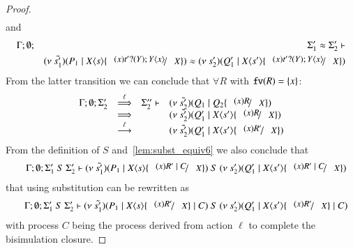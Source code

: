 \begin{proof}
\[\begin{array}{rcll}
	\end{array}
\]
%
	\noi and
%
	\begin{eqnarray}
		\Gamma; \es; &&\Sigma_1' \wb \Sigma_2' \proves \\
		&&\newsp{\tilde{s_1'}}{P_1 \Par \appl{X}{s} \subst{(x) \binp{t'}{Y} \appl{Y}{x}}{X}} \wb \newsp{s_2'}{Q_1' \Par \appl{X}{s'} \subst{(x) \binp{t'}{Y} \appl{Y}{x}}{X}}
		\label{lem:subst_equiv6}
	\end{eqnarray} 
%
	\noi From the latter transition we can conclude that $\forall R$ with $\mathtt{fv}(R) = \{x\}$:
%
\[
	\begin{array}{rcll}
		\Gamma; \es; \Sigma_2' &\By{\ell}& \Sigma_2'' \proves &
		\newsp{\tilde{s_2'}}{Q_1 \Par Q_2 \subst{(x) R}{X}}\\
		&\By{}& &
		\newsp{\tilde{s_2'}}{Q_1' \Par \appl{X}{s'} \subst{(x) R}{X}} \\
		&\by{\ell}& &
		\newsp{\tilde{s_2'}}{Q_1' \Par \appl{X}{s'} \subst{(x) R'}{X}} \\
	\end{array}
\]
%
	\noi From the definition of $S$ and~\ref{lem:subst_equiv6}
	we also conclude that
	\begin{eqnarray*}
		&&\Gamma; \es; \Sigma_1'\ S\ \Sigma_2' \proves 
		\newsp{\tilde{s_1'}}{P_1 \Par \appl{X}{s} \subst{(x) R' \Par C}{X}}\ S\ \newsp{s_2'}{Q_1' \Par \appl{X}{s'} \subst{(x) R' \Par C}{X}}
	\end{eqnarray*}
	\noi that using substitution can be rewritten as
	\begin{eqnarray*}
		&&\Gamma; \es; \Sigma_1'\ S\ \Sigma_2' \proves 
		\newsp{\tilde{s_1'}}{P_1 \Par \appl{X}{s} \subst{(x) R'}{X} \Par C}\ S\ \newsp{s_2'}{Q_1' \Par \appl{X}{s'} \subst{(x) R'}{X} \Par C}
	\end{eqnarray*}
	\noi with process $C$ being the process derived from action $\ell$
	to complete the bisimulation closure.
\end{proof}



